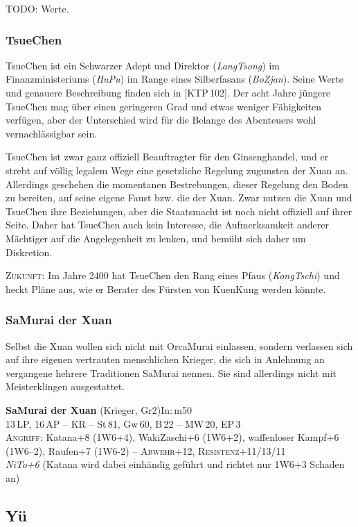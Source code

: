 \documentclass[
a4paper,
twoside,
DIV=calc,
BCOR=4mm,
fontsize=9pt,
twocolumn=on,
titlepage=on,
parskip=half
]{scrartcl}
\begin{document}
TODO: Werte.

\subsubsection{TsueChen}

TsueChen ist ein Schwarzer Adept und Direktor (\emph{LangTsong}) im
Finanzministeriums (\emph{HuPu}) im Range eines Silberfasans
(\emph{BoZjan}). Seine Werte und genauere Beschreibung finden sich in
[KTP\,102]. Der acht Jahre jüngere TsueChen mag über einen geringeren
Grad und etwas weniger Fähigkeiten verfügen, aber der Unterschied wird
für die Belange des Abenteuers wohl vernachlässigbar sein.

TsueChen ist zwar ganz offiziell Beauftragter für den Ginsenghandel,
und er strebt auf völlig legalem Wege eine gesetzliche Regelung
zugunsten der Xuan an. Allerdings geschehen die momentanen Bestrebungen, dieser
Regelung den Boden zu bereiten, auf seine eigene Faust bzw. die der
Xuan. Zwar nutzen die Xuan und TsueChen ihre Beziehungen, aber die
Staatsmacht ist noch nicht offiziell auf ihrer Seite. Daher hat
TsueChen auch kein Interesse, die Aufmerksamkeit anderer Mächtiger auf die
Angelegenheit zu lenken, und bemüht sich daher um Diskretion.

\textsc{Zukunft:} Im Jahre 2400 hat TsueChen den Rang eines Pfaus
(\emph{KongTschi}) und heckt Pläne aus, wie er Berater des Fürsten von
KuenKung werden könnte.

\subsubsection{SaMurai der Xuan}

Selbst die Xuan wollen sich nicht mit OrcaMurai einlassen, sondern
verlassen sich auf ihre eigenen vertrauten menschlichen Krieger, die
sich in Anlehnung an vergangene hehrere Traditionen SaMurai
nennen. Sie sind allerdings nicht mit Meisterklingen ausgestattet.

\textbf{SaMurai der Xuan} (Krieger, Gr2)\hfill In:\,m50\\
13\,LP, 16\,AP -- KR -- St\,81, Gw\,60, B\,22 -- MW\,20, EP\,3\\
\textsc{Angriff:} Katana+8 (1W6+4), WakiZaschi+6 (1W6+2), waffenloser
Kampf+6 (1W6--2), Raufen+7 (1W6-2) -- \textsc{Abwehr}+12,
\textsc{Resistenz}+11/13/11\\
\emph{NiTo+6} (Katana wird dabei einhändig geführt und richtet nur
1W6+3 Schaden an)

\subsection{Yü}
\end{document}
